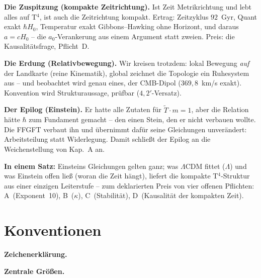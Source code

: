 \textbf{Die Zuspitzung (kompakte Zeitrichtung).} Ist Zeit
Metrikrichtung und lebt alles auf T$^4$, ist auch die Zeitrichtung
kompakt. Ertrag: Zeitzyklus $92$~Gyr, Quant exakt $\hbar H_0$,
Temperatur exakt Gibbons--Hawking ohne Horizont, und daraus
$a = cH_0$ -- die $a_0$-Verankerung aus einem Argument statt
zweien. Preis: die Kausalitätsfrage, Pflicht~D.

\textbf{Die Erdung (Relativbewegung).} Wir kreisen trotzdem:
lokal Bewegung \emph{auf} der Landkarte (reine Kinematik), global
zeichnet die Topologie ein Ruhesystem aus -- und beobachtet wird
genau eines, der CMB-Dipol ($369{,}8$~km/s exakt). Konvention wird
Strukturaussage, prüfbar ($4{,}2'$-Versatz).

\textbf{Der Epilog (Einstein).} Er hatte alle Zutaten für
$\tilde T \cdot m = 1$, aber die Relation hätte $\hbar$ zum
Fundament gemacht -- den einen Stein, den er nicht verbauen wollte.
Die FFGFT verbaut ihn und übernimmt dafür seine Gleichungen
unverändert: Arbeitsteilung statt Widerlegung. Damit schließt der
Epilog an die Weichenstellung von Kap.~A an.

\medskip
\noindent\textbf{In einem Satz:} Einsteins Gleichungen gelten
ganz; was $\Lambda$CDM fittet ($\Lambda$) und was Einstein offen
ließ (woran die Zeit hängt), liefert die kompakte T$^4$-Struktur
aus einer einzigen Leiterstufe -- zum deklarierten Preis von vier
offenen Pflichten: A~(Exponent~10), B~($\kappa$), C~(Stabilität),
D~(Kausalität der kompakten Zeit).

\section*{Konventionen}

\noindent\textbf{Zeichenerklärung.}

\medskip


\medskip
\noindent\textbf{Zentrale Größen.}

